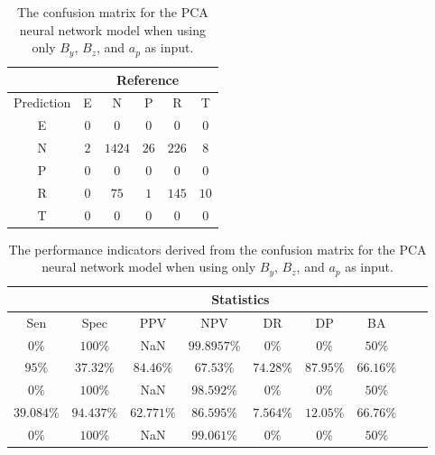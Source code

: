 \begin{table}[!ht]
	\centering
	\begin{tabular}{|c|c|c|c|c|c|}
		\hline
		 & \multicolumn{5}{|c|}{Reference} \\ \hline
		 Prediction & E & N & P & R & T \\ \hline
		 E & $0$ & $0$ & $0$ & $0$ & $0$ \\ \hline
		 N & $2$ & $1424$ & $26$ & $226$ & $8$ \\ \hline
		 P & $0$ & $0$ & $0$ & $0$ & $0$ \\ \hline
		 R & $0$ & $75$ & $1$ & $145$ & $10$ \\ \hline
		 T & $0$ & $0$ & $0$ & $0$ & $0$ \\ \hline
	\end{tabular}
	\caption{The confusion matrix for the PCA neural network model when using only $B_{y}$, $B_{z}$, and $a_{p}$ as input.}
	\label{tab:cm:yzap:pcaNNet}
\end{table}

\begin{table}[!ht]
	\centering
	\begin{tabular}{|c|c|c|c|c|c|c|c|c|}
		\hline
		 & \multicolumn{7}{c|}{Statistics} \\ \hline
		Sen & Spec & PPV & NPV & DR & DP & BA \\ \hline
		$0\%$ & $100\%$ & NaN & $99.8957\%$ & $0\%$ & $0\%$ & $50\%$ \\ \hline
		$95\%$ & $37.32\%$ & $84.46\%$ & $67.53\%$ & $74.28\%$ & $87.95\%$ & $66.16\%$ \\ \hline
		$0\%$ & $100\%$ & NaN & $98.592\%$ & $0\%$ & $0\%$ & $50\%$ \\ \hline
		$39.084\%$ & $94.437\%$ & $62.771\%$ & $86.595\%$ & $7.564\%$ & $12.05\%$ & $66.76\%$ \\ \hline
		$0\%$ & $100\%$ & NaN & $99.061\%$ & $0\%$ & $0\%$ & $50\%$ \\ \hline
	\end{tabular}
	\caption{The performance indicators derived from the confusion matrix for the PCA neural network model when using only $B_{y}$, $B_{z}$, and $a_{p}$ as input.}
	\label{tab:cs:yzap:pcaNNet}
\end{table}

